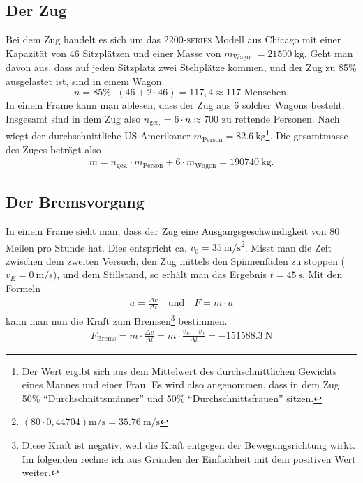 \documentclass[a4paper, 11pt, nofonts, 
twoside, sfsidenotes, nobib, justified]{tufte-handout}
\begin{document}
\subsection{Der Zug}
Bei dem Zug handelt es sich um das \textsc{2200-series} Modell aus Chicago mit einer Kapazität von 46 Sitzplätzen und einer Masse von $m_\text{Wagon}=\SI{21500}{\kilogram}$. \cite{WSem03} Geht man davon aus, dass auf jeden Sitzplatz zwei Stehplätze kommen, und der Zug zu 85\% ausgelastet ist, sind in einem Wagon 
$$n = 85\%\cdot \left( 46 + 2\cdot 46 \right)=117,4\approx 117 \text{ Menschen.}$$ In einem Frame kann man ablesen, dass der Zug aus 6 solcher Wagons besteht. Insgesamt sind in dem Zug also $n_\text{ges.} = 6\cdot n \approx 700$ zu rettende Personen. Nach \cite{WSem04} wiegt der durchschnittliche US-Amerikaner $m_\text{Person}=\SI{82.6}{\kilogram}$\footnote{Der Wert ergibt sich aus dem Mittelwert des durchschnittlichen Gewichts eines Mannes und einer Frau. Es wird also angenommen, dass in dem Zug 50\% ``Durchschnittsmänner'' und 50\% ``Durchschnittsfrauen'' sitzen.}. Die gesamtmasse des Zuges beträgt also
\begin{align*}
	m = n_\text{ges.} \cdot m_\text{Person} + 6\cdot m_\text{Wagon}=\SI{190740}{\kilogram}.
\end{align*}
\subsection{Der Bremsvorgang}
In einem Frame sieht man, dass der Zug eine Ausgangsgeschwindigkeit von 80 Meilen pro Stunde hat. Dies entspricht ca. $v_0=\SI{35}{\meter\per\second}$\footnote{$(80\cdot 0,44704)\si{\meter\per\second}=\SI{35.76}{\meter\per\second}$}. \cite{WSem02} Misst man die Zeit zwischen dem zweiten Versuch, den Zug mittels den Spinnenfäden zu stoppen ($v_E=\SI{0}{\meter\per\second}$), und dem Stillstand, so erhält man das Ergebnis $t=\SI{45}{\second}$. Mit den Formeln 
\begin{align}
	a=\frac{\Delta v}{\Delta t} \quad \text{und}\quad  F = m\cdot a 
\end{align} kann man nun die Kraft zum Bremsen\footnote{Diese Kraft ist negativ, weil die Kraft entgegen der Bewegungsrichtung wirkt. Im folgenden rechne ich aus Gründen der Einfachheit mit dem positiven Wert weiter.} bestimmen.
\begin{align*}
	F_\text{Brems} = m \cdot \frac{\Delta v}{\Delta t} = m \cdot \frac{v_E -v_0}{\Delta t} = \SI{-151588.3}{\newton}
\end{align*}
\end{document}

